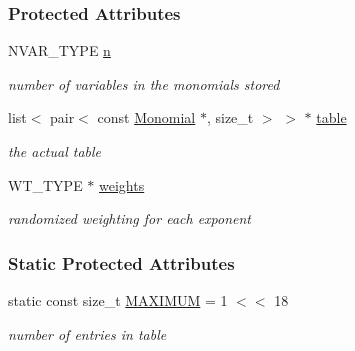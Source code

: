 \subsubsection*{Protected Attributes}
\begin{DoxyCompactItemize}
\item 
\mbox{\label{group___g_b_computation_ab0d30e19b178ed579bd97fc98c4e3de5}} 
N\+V\+A\+R\+\_\+\+T\+Y\+PE \hyperlink{group___g_b_computation_ab0d30e19b178ed579bd97fc98c4e3de5}{n}
\begin{DoxyCompactList}\small\item\em number of variables in the monomials stored \end{DoxyCompactList}\item 
\mbox{\label{group___g_b_computation_a80d0b9f0d0f2edb34659b27e2520f083}} 
list$<$ pair$<$ const \hyperlink{group__polygroup_class_monomial}{Monomial} $\ast$, size\+\_\+t $>$ $>$ $\ast$ \hyperlink{group___g_b_computation_a80d0b9f0d0f2edb34659b27e2520f083}{table}
\begin{DoxyCompactList}\small\item\em the actual table \end{DoxyCompactList}\item 
\mbox{\label{group___g_b_computation_a894a6279c130dd1cdfea12845448e331}} 
W\+T\+\_\+\+T\+Y\+PE $\ast$ \hyperlink{group___g_b_computation_a894a6279c130dd1cdfea12845448e331}{weights}
\begin{DoxyCompactList}\small\item\em randomized weighting for each exponent \end{DoxyCompactList}\end{DoxyCompactItemize}
\subsubsection*{Static Protected Attributes}
\begin{DoxyCompactItemize}
\item 
\mbox{\label{group___g_b_computation_acf7ba1127b19f75bfcd7177c4de99d01}} 
static const size\+\_\+t \hyperlink{group___g_b_computation_acf7ba1127b19f75bfcd7177c4de99d01}{M\+A\+X\+I\+M\+UM} = 1 $<$$<$ 18
\begin{DoxyCompactList}\small\item\em number of entries in table \end{DoxyCompactList}\end{DoxyCompactItemize}
